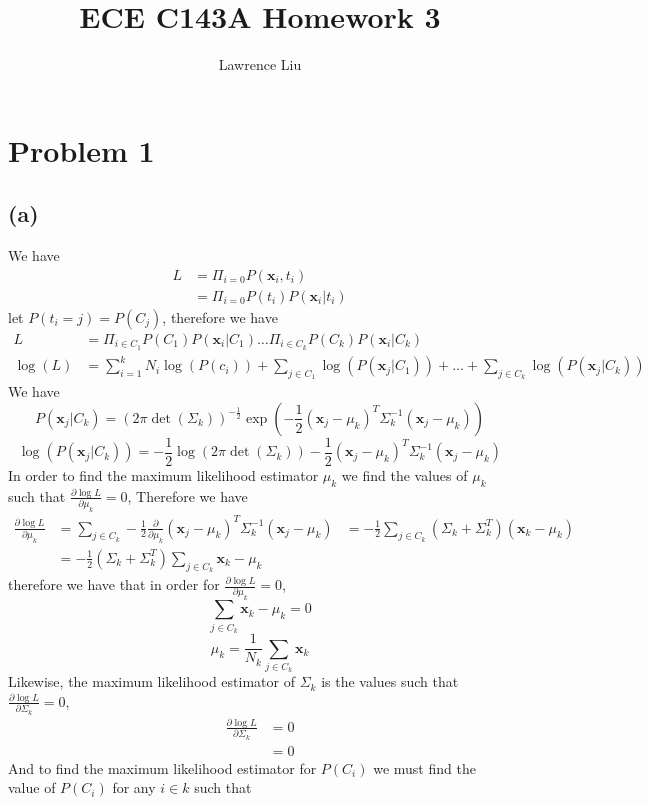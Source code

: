 \documentclass[12pt]{article}
\title{ECE C143A Homework 3}
\author{Lawrence Liu}
\begin{document}
\maketitle
\section*{Problem 1}
\subsection*{(a)}
We have
\begin{align*}
    L&=\Pi_{i=0}P(\textbf{x}_i,t_i)\\
    &=\Pi_{i=0}P(t_i)P(\textbf{x}_i|t_i)
\end{align*}
let $P(t_i=j)=P(C_j)$, therefore we have
\begin{align*}
    L&=\Pi_{i\in C_1}P(C_1)P(\textbf{x}_i|C_1)\dots \Pi_{i\in C_k}P(C_k)P(\textbf{x}_i|C_k)\\
    \log(L)&=\sum_{i=1}^{k}N_i\log(P(c_i))+\sum_{j\in C_1}\log(P(\textbf{x}_j|C_1))+
                    \dots+\sum_{j\in C_k}\log(P(\textbf{x}_j|C_k))
\end{align*}
We have
$$P(\textbf{x}_j|C_k)=(2\pi\det(\Sigma_k))^{-\frac{1}{2}}\exp(-\frac{1}{2}(\textbf{x}_j-\mu_k)^T\Sigma_k^{-1}(\textbf{x}_j-\mu_k))$$
$$\log(P(\textbf{x}_j|C_k))=-\frac{1}{2}\log(2\pi\det(\Sigma_k))-\frac{1}{2}(\textbf{x}_j-\mu_k)^T\Sigma_k^{-1}(\textbf{x}_j-\mu_k)$$
In order to find the maximum likelihood estimator $\mu_k$ we find the values of $\mu_k$ such that $\frac{\partial \log{L}}{\partial \mu_k}=0$,
Therefore we have
\begin{align*}
\frac{\partial \log{L}}{\partial \mu_k}&=\sum_{j\in C_k}-\frac{1}{2}\frac{\partial}{\partial\mu_k}(\textbf{x}_j-\mu_k)^T\Sigma_k^{-1}(\textbf{x}_j-\mu_k)
&=-\frac{1}{2}\sum_{j\in C_k}(\Sigma_k+\Sigma_k^{T})(\textbf{x}_k-\mu_k)\\
&=-\frac{1}{2}(\Sigma_k+\Sigma_k^{T})\sum_{j\in C_k}\textbf{x}_k-\mu_k
\end{align*}
therefore we have that in order for $\frac{\partial \log{L}}{\partial \mu_k}=0$,
$$\sum_{j\in C_k}\textbf{x}_k-\mu_k=0$$
$$\boxed{\mu_k=\frac{1}{N_k}\sum_{j\in C_k}\textbf{x}_k}$$
Likewise, the maximum likelihood estimator of $\Sigma_k$ is the values such that $\frac{\partial \log{L}}{\partial \Sigma_k}=0$,
\begin{align*}
\frac{\partial \log{L}}{\partial \Sigma_k}&=0\\
&=0    
\end{align*}
And to find the maximum likelihood estimator for $P(C_i)$ we must find the value of $P(C_i)$ for any $i\in k$ such that 
\end{document}
